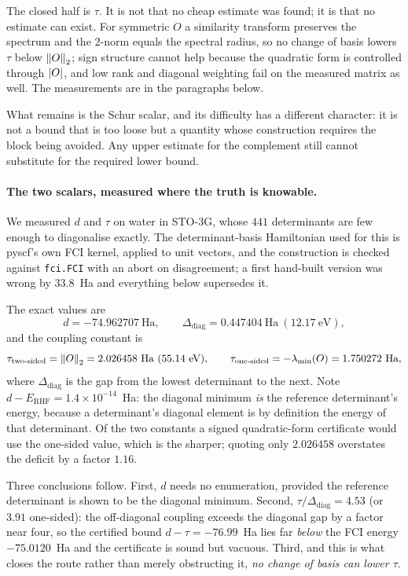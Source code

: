 The closed half is $\tau$. It is not that no cheap estimate was found; it is that no
estimate can exist. For symmetric $O$ a similarity transform preserves the spectrum
and the $2$-norm equals the spectral radius, so no change of basis lowers $\tau$
below $\left\lVert O\right\rVert_2$; sign structure cannot help because the quadratic form is
controlled through $\left\lvert O\right\rvert$, and low rank and diagonal weighting fail on the
measured matrix as well. The measurements are in the paragraphs below.

What remains is the Schur scalar, and its difficulty has a different character: it
is not a bound that is too loose but a quantity whose construction requires the
block being avoided. Any upper estimate for the complement still cannot substitute
for the required lower bound.

\paragraph{The two scalars, measured where the truth is knowable.}
We measured $d$ and $\tau$ on water in STO-3G, whose $441$ determinants are few
enough to diagonalise exactly. The determinant-basis Hamiltonian used for this is
pyscf's own FCI kernel, applied to unit vectors, and the construction is checked
against \texttt{fci.FCI} with an abort on disagreement; a first hand-built version
was wrong by $33.8$~Ha and everything below supersedes it.

The exact values are
\[
d = -74.962707\ \text{Ha},\qquad
\Delta_{\mathrm{diag}} = 0.447404\ \text{Ha}\ (12.17\ \text{eV}),
\]
and the coupling constant is
\[
\tau_{\text{two-sided}} = \norm{O}_2 = 2.026458\ \text{Ha}\ (55.14\ \text{eV}),
\qquad
\tau_{\text{one-sided}} = -\lambda_{\min}(O) = 1.750272\ \text{Ha},
\]
where $\Delta_{\mathrm{diag}}$ is the gap from the lowest determinant to the next.
Note $d - E_{\mathrm{RHF}} = 1.4\times10^{-14}$~Ha: the diagonal minimum \emph{is}
the reference determinant's energy, because a determinant's diagonal element is by
definition the energy of that determinant. Of the two constants a signed
quadratic-form certificate would use the one-sided value, which is the sharper;
quoting only $2.026458$ overstates the deficit by a factor $1.16$.

Three conclusions follow. First, $d$ needs no enumeration, provided the reference
determinant is shown to be the diagonal minimum. Second,
$\tau/\Delta_{\mathrm{diag}} = 4.53$ (or $3.91$ one-sided): the off-diagonal
coupling exceeds the diagonal gap by a factor near four, so the certified bound
$d-\tau = -76.99$~Ha lies far \emph{below} the FCI energy $-75.0120$~Ha and the
certificate is sound but vacuous. Third, and this is what closes the route rather
than merely obstructing it, \emph{no change of basis can lower $\tau$}.

